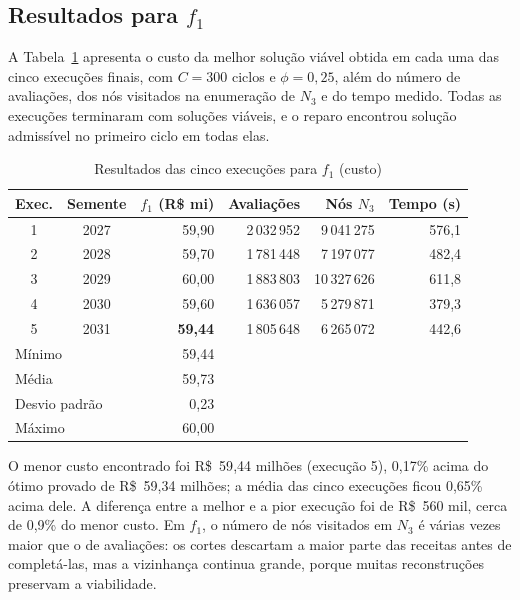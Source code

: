 \documentclass[conference]{IEEEtran}
\begin{document}
\subsection{Resultados para $f_1$}

A Tabela~\ref{tab:res_f1} apresenta o custo da melhor solução viável obtida em cada uma das cinco execuções finais, com $C=300$ ciclos e $\phi=0{,}25$, além do número de avaliações, dos nós visitados na enumeração de $N_3$ e do tempo medido. Todas as execuções terminaram com soluções viáveis, e o reparo encontrou solução admissível no primeiro ciclo em todas elas.

\begin{table}[htbp]
\caption{Resultados das cinco execuções para $f_1$ (custo)}
\centering
\small\setlength{\tabcolsep}{2.8pt}
\begin{tabular}{c c r r r r}
\toprule
\textbf{Exec.} & \textbf{Semente} & \textbf{$f_1$ (R\$ mi)} & \textbf{Avaliações} & \textbf{Nós $N_3$} & \textbf{Tempo (s)} \\
\midrule
1 & 2027 & 59{,}90 & 2\,032\,952 & 9\,041\,275 & 576{,}1 \\
2 & 2028 & 59{,}70 & 1\,781\,448 & 7\,197\,077 & 482{,}4 \\
3 & 2029 & 60{,}00 & 1\,883\,803 & 10\,327\,626 & 611{,}8 \\
4 & 2030 & 59{,}60 & 1\,636\,057 & 5\,279\,871 & 379{,}3 \\
5 & 2031 & \textbf{59{,}44} & 1\,805\,648 & 6\,265\,072 & 442{,}6 \\
\midrule
\multicolumn{2}{l}{Mínimo} & 59{,}44 & & & \\
\multicolumn{2}{l}{Média} & 59{,}73 & & & \\
\multicolumn{2}{l}{Desvio padrão} & 0{,}23 & & & \\
\multicolumn{2}{l}{Máximo} & 60{,}00 & & & \\
\bottomrule
\end{tabular}
\label{tab:res_f1}
\end{table}

O menor custo encontrado foi R\$~59{,}44 milhões (execução 5), 0{,}17\% acima do ótimo provado de R\$~59{,}34 milhões; a média das cinco execuções ficou 0{,}65\% acima dele. A diferença entre a melhor e a pior execução foi de R\$~560 mil, cerca de 0{,}9\% do menor custo. Em $f_1$, o número de nós visitados em $N_3$ é várias vezes maior que o de avaliações: os cortes descartam a maior parte das receitas antes de completá-las, mas a vizinhança continua grande, porque muitas reconstruções preservam a viabilidade.
\end{document}
